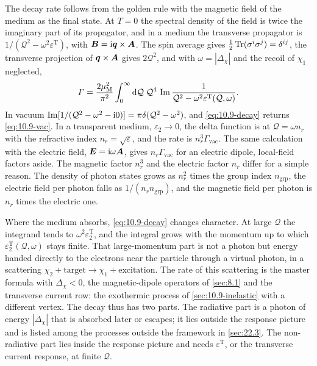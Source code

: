 The decay rate follows from the golden rule with the magnetic field of the medium as the final state. At $T = 0$ the spectral density of the field is twice the imaginary part of its propagator, and in a medium the transverse propagator is $1/(\mathcal{Q}^2 - \omega^2\varepsilon^{\mathrm{T}})$, with $\bm{B} = \mathrm{i}\bm{q}\times\bm{A}$. The spin average gives $\frac12\operatorname{Tr}(\sigma^i\sigma^j) = \delta^{ij}$, the transverse projection of $\bm{q}\times\bm{A}$ gives $2\mathcal{Q}^2$, and with $\omega = |\Delta_\chi|$ and the recoil of $\chi_1$ neglected,
\begin{equation}
  \varGamma = \frac{2\mu_{\mathrm{M}}^2}{\pi^2}\int_0^\infty\mathrm{d}\mathcal{Q}\;\mathcal{Q}^4\,\operatorname{Im}\frac{1}{\mathcal{Q}^2 - \omega^2\varepsilon^{\mathrm{T}}(\mathcal{Q},\omega)} .
  \label{eq:10.9-decay}
\end{equation}
In vacuum $\operatorname{Im}[1/(\mathcal{Q}^2 - \omega^2 - \mathrm{i}0)] = \pi\delta(\mathcal{Q}^2 - \omega^2)$, and \cref{eq:10.9-decay} returns \cref{eq:10.9-vac}. In a transparent medium, $\varepsilon_2 \to 0$, the delta function is at $\mathcal{Q} = \omega n_r$ with the refractive index $n_r = \sqrt{\varepsilon}$, and the rate is $n_r^3\varGamma_{\mathrm{vac}}$. The same calculation with the electric field, $\bm{E} = \mathrm{i}\omega\bm{A}$, gives $n_r\varGamma_{\mathrm{vac}}$ for an electric dipole, local-field factors aside. The magnetic factor $n_r^3$ and the electric factor $n_r$ differ for a simple reason. The density of photon states grows as $n_r^2$ times the group index $n_{\mathrm{grp}}$, the electric field per photon falls as $1/(n_rn_{\mathrm{grp}})$, and the magnetic field per photon is $n_r$ times the electric one.

Where the medium absorbs, \cref{eq:10.9-decay} changes character. At large $\mathcal{Q}$ the integrand tends to $\omega^2\varepsilon_2^{\mathrm{T}}$, and the integral grows with the momentum up to which $\varepsilon_2^{\mathrm{T}}(\mathcal{Q},\omega)$ stays finite. That large-momentum part is not a photon but energy handed directly to the electrons near the particle through a virtual photon, in a scattering $\chi_2 + \text{target} \to \chi_1 + \text{excitation}$. The rate of this scattering is the master formula with $\Delta_\chi < 0$, the magnetic-dipole operators of \cref{sec:8.1} and the transverse current row: the exothermic process of \cref{sec:10.9-inelastic} with a different vertex. The decay thus has two parts. The radiative part is a photon of energy $|\Delta_\chi|$ that is absorbed later or escapes; it lies outside the response picture and is listed among the processes outside the framework in \cref{sec:22.3}. The non-radiative part lies inside the response picture and needs $\varepsilon^{\mathrm{T}}$, or the transverse current response, at finite $\mathcal{Q}$.

